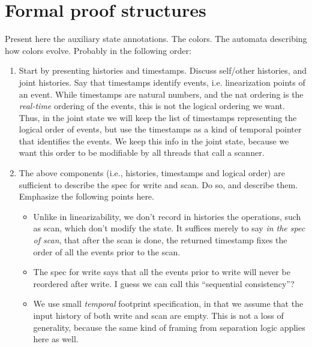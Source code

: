\section{Formal proof structures}
\label{sc:formal}

Present here the auxiliary state annotations. The colors. The automata
describing how colors evolve. Probably in the following order:

\begin{enumerate}
\item Start by presenting histories and timestamps. Discuss self/other
  histories, and joint histories. Say that timestamps identify events,
  i.e. linearization points of an event. While timestamps are natural
  numbers, and the nat ordering is the \emph{real-time} ordering of
  the events, this is not the logical ordering we want. Thus, in the
  joint state we will keep the list of timestamps representing the
  logical order of events, but use the timestamps as a kind of
  temporal pointer that identifies the events. We keep this info in
  the joint state, because we want this order to be modifiable by all
  threads that call a scanner.

\item The above components (i.e., histories, timestamps and logical
  order) are sufficient to describe the spec for write and scan.  Do
  so, and describe them. Emphasize the following points here.

 
  \begin{itemize}
  \item Unlike in linearizability, we don't record in histories the
  operations, such as scan, which don't modify the state. It suffices
  merely to say \emph{in the spec of scan}, that after the scan is
  done, the returned timestamp fixes the order of all the events prior
  to the scan.

  \item The spec for write says that all the events prior to write
  will never be reordered after write. I guess we can call this
  ``sequential consistency''?

\item We use small \emph{temporal} footprint specification, in that we
  assume that the input history of both write and scan are empty. This
  is not a loss of generality, because the same kind of framing from
  separation logic applies here as well.  
  \end{itemize}


\end{enumerate}

